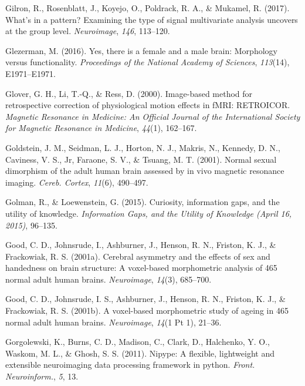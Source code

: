 \documentclass[11pt,american,a4paper,oneside,]{memoir} %
\begin{document}
\leavevmode\hypertarget{ref-Gilron2017-tl}{}%
Gilron, R., Rosenblatt, J., Koyejo, O., Poldrack, R. A., \& Mukamel, R. (2017). What's in a pattern? Examining the type of signal multivariate analysis uncovers at the group level. \emph{Neuroimage}, \emph{146}, 113--120.

\leavevmode\hypertarget{ref-Glezerman2016-xl}{}%
Glezerman, M. (2016). Yes, there is a female and a male brain: Morphology versus functionality. \emph{Proceedings of the National Academy of Sciences}, \emph{113}(14), E1971--E1971.

\leavevmode\hypertarget{ref-Glover2000-or}{}%
Glover, G. H., Li, T.-Q., \& Ress, D. (2000). Image-based method for retrospective correction of physiological motion effects in fMRI: RETROICOR. \emph{Magnetic Resonance in Medicine: An Official Journal of the International Society for Magnetic Resonance in Medicine}, \emph{44}(1), 162--167.

\leavevmode\hypertarget{ref-Goldstein2001-dy}{}%
Goldstein, J. M., Seidman, L. J., Horton, N. J., Makris, N., Kennedy, D. N., Caviness, V. S., Jr, Faraone, S. V., \& Tsuang, M. T. (2001). Normal sexual dimorphism of the adult human brain assessed by in vivo magnetic resonance imaging. \emph{Cereb. Cortex}, \emph{11}(6), 490--497.

\leavevmode\hypertarget{ref-golman2015curiosity}{}%
Golman, R., \& Loewenstein, G. (2015). Curiosity, information gaps, and the utility of knowledge. \emph{Information Gaps, and the Utility of Knowledge (April 16, 2015)}, 96--135.

\leavevmode\hypertarget{ref-Good2001-ak}{}%
Good, C. D., Johnsrude, I., Ashburner, J., Henson, R. N., Friston, K. J., \& Frackowiak, R. S. (2001a). Cerebral asymmetry and the effects of sex and handedness on brain structure: A voxel-based morphometric analysis of 465 normal adult human brains. \emph{Neuroimage}, \emph{14}(3), 685--700.

\leavevmode\hypertarget{ref-Good2001-kv}{}%
Good, C. D., Johnsrude, I. S., Ashburner, J., Henson, R. N., Friston, K. J., \& Frackowiak, R. S. (2001b). A voxel-based morphometric study of ageing in 465 normal adult human brains. \emph{Neuroimage}, \emph{14}(1 Pt 1), 21--36.

\leavevmode\hypertarget{ref-Gorgolewski2011-aa}{}%
Gorgolewski, K., Burns, C. D., Madison, C., Clark, D., Halchenko, Y. O., Waskom, M. L., \& Ghosh, S. S. (2011). Nipype: A flexible, lightweight and extensible neuroimaging data processing framework in python. \emph{Front. Neuroinform.}, \emph{5}, 13.
\end{document}
